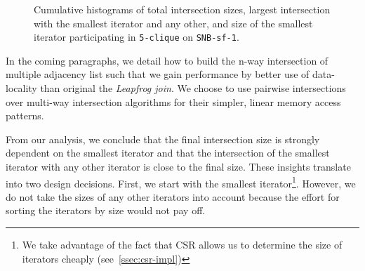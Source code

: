 \begin{figure}[H]
\centering
{}
\hfill
{}
\hfill
{}
\caption{Cumulative histograms of total intersection sizes, largest intersection with the smallest iterator and any other, and size of the
smallest iterator participating in \texttt{5-clique} on \texttt{SNB-sf-1}.}
\label{fig:intersection-workload}
\end{figure}

In the coming paragraphs, we detail how to build the n-way intersection of multiple adjacency list
such that we gain performance by better use of data-locality than original the \textit{Leapfrog join}.
We choose to use pairwise intersections over multi-way intersection algorithms for their simpler,
linear memory access patterns.

From our analysis, we conclude that the final intersection size is strongly dependent on the
smallest iterator and that the intersection of the smallest iterator with any other iterator is
close to the final size.
These insights translate into two design decisions.
First, we start with the smallest iterator\footnote{We take advantage of the fact that CSR allows us
to determine the size of iterators cheaply (see~\cref{ssec:csr-impl})}.
However, we do not take the sizes of any other iterators into account because the effort for
sorting the iterators by size would not pay off.


